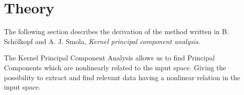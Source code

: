 \section{Theory}
The following section describes the derivation of the method written in B. Schölkopf and A. J. Smola, \textit{Kernel principal component analysis}\cite{scholkopf1997kernel}.

The Kernel Principal Component Analysis allows us to find Principal Components which are nonlinearly related to the input space. Giving the possibility to extract and find relevant data having a nonlinear relation in the input space.





